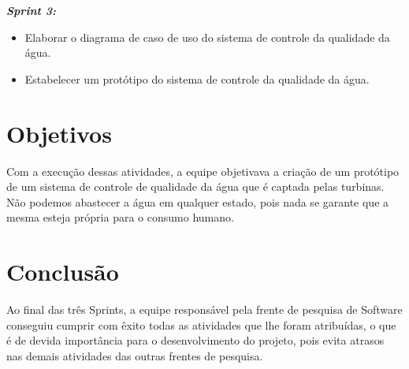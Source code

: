 \documentclass[12pt,openright,oneside,a4paper,brazil]{abntex2}
\begin{document}
\textbf{\emph{Sprint 3:}}
\begin{itemize}
\item Elaborar o diagrama de caso de uso do sistema de controle da qualidade da água.
\item Estabelecer um protótipo do sistema de controle da qualidade da água.
\end{itemize}
 
\section*{Objetivos}
Com a execução dessas atividades, a equipe objetivava a criação de um protótipo de um sistema de controle de qualidade da água que é captada pelas turbinas. Não podemos abastecer a água em qualquer estado, pois nada se garante que a mesma esteja própria para o consumo humano.

\section*{Conclusão}
Ao final das três Sprints, a equipe responsável pela frente de pesquisa de Software conseguiu cumprir com êxito todas as atividades que lhe foram atribuídas, o que é de devida importância para o desenvolvimento do projeto, pois evita atrasos nas demais atividades das outras frentes de pesquisa. 
\end{document}
